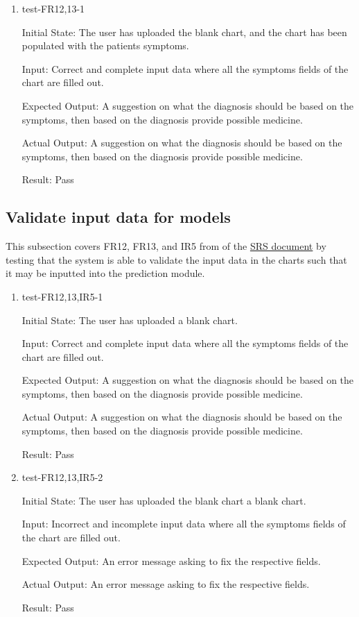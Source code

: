 \documentclass[12pt, titlepage]{article}
\begin{document}
\begin{enumerate}

  \item{test-FR12,13-1} \label{test-FR12,13-1}
  
  Initial State: The user has uploaded the blank chart, and the chart has been populated with the patients symptoms.

  Input: Correct and complete input data where all the symptoms fields of the chart are filled out.

  Expected Output: A suggestion on what the diagnosis should be based on the symptoms, then based on the diagnosis provide possible medicine.

  Actual Output: A suggestion on what the diagnosis should be based on the symptoms, then based on the diagnosis provide possible medicine.

  Result: Pass

\end{enumerate}


\subsection{Validate input data for models} \label{section:3.7}

This subsection covers FR12, FR13, and IR5 from of the \href{https://github.com/Inreet-Kaur/capstone/blob/main/docs/SRS/SRS.pdf} {SRS document} by testing that the system is able to validate the input data in the charts such that it may be inputted into the prediction module.

\begin{enumerate}

  \item{test-FR12,13,IR5-1} \label{test-FR12,13,IR5-1}
  
  Initial State: The user has uploaded a blank chart.

  Input: Correct and complete input data where all the symptoms fields of the chart are filled out.

  Expected Output: A suggestion on what the diagnosis should be based on the symptoms, then based on the diagnosis provide possible medicine.

  Actual Output: A suggestion on what the diagnosis should be based on the symptoms, then based on the diagnosis provide possible medicine.

  Result: Pass

  \item{test-FR12,13,IR5-2} \label{test-FR12,13,IR5-2}
  
  Initial State: The user has uploaded the blank chart a blank chart.

  Input: Incorrect and incomplete input data where all the symptoms fields of the chart are filled out.

  Expected Output: An error message asking to fix the respective fields.

  Actual Output: An error message asking to fix the respective fields.

  Result: Pass

\end{enumerate}
\end{document}
